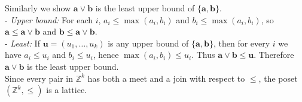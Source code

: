 \documentclass{article}
\begin{document}
Similarly we show \(\mathbf{a}\vee\mathbf{b}\) is the least upper bound of \(\{\mathbf{a},\mathbf{b}\}\).  \\
- \emph{Upper bound:} For each \(i\), \(a_i\le\max(a_i,b_i)\) and \(b_i\le\max(a_i,b_i)\), so \(\mathbf{a}\le\mathbf{a}\vee\mathbf{b}\) and \(\mathbf{b}\le\mathbf{a}\vee\mathbf{b}\).\\  
- \emph{Least:} If \(\mathbf{u}=(u_1,\dots,u_k)\) is any upper bound of \(\{\mathbf{a},\mathbf{b}\}\), then for every \(i\) we have \(a_i\le u_i\) and \(b_i\le u_i\), hence \(\max(a_i,b_i)\le u_i\). Thus \(\mathbf{a}\vee\mathbf{b}\le\mathbf{u}\). Therefore \(\mathbf{a}\vee\mathbf{b}\) is the least upper bound.\\

Since every pair in \(\mathbb{Z}^k\) has both a meet and a join with respect to \(\le\), the poset \((\mathbb{Z}^k,\le)\) is a lattice.
\end{document}
